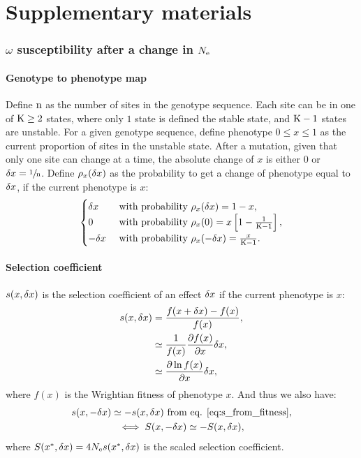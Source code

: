 \documentclass{article}
\renewcommand*{\bm}[1]{#1}%
\begin{document}
\part*{Supplementary materials}
\tableofcontents
\section{$\bm{\omega}$ susceptibility after a change in $\bm{\Ne}$}
\subsection{Genotype to phenotype map}
Define $\text{n}$ as the number of sites in the genotype sequence.
Each site can be in one of $\text{K} \geq 2$ states, where only $1$ state is defined the stable state, and $\text{K} - 1$ states are unstable.
For a given genotype sequence, define phenotype $0 \leq x \leq 1$ as the current proportion of sites in the unstable state.
After a mutation, given that only one site can change at a time, the absolute change of $x$ is either $0$ or $\delta x=\sfrac{1}{\text{n}}$.
Define $\rho_{x}(\delta x)$ as the probability to get a change of phenotype equal to $\delta x$, if the current phenotype is $x$:\\
\begin{gather}
\begin{cases}
\delta x &\text{ with probability } \rho_{x}(\delta x) = 1-x, \\
0 &\text{ with probability } \rho_{x}(0) = x \left[1 - \frac{1}{\text{K} - 1}\right], \\
-\delta x &\text{ with probability } \rho_{x}(-\delta x) = \frac{x}{\text{K} - 1}.\\
\end{cases} \label{eq:proba}
\end{gather}
\subsection{Selection coefficient}
$s(x, \delta x)$ is the selection coefficient of an effect $\delta x$ if the current phenotype is $x$:
\begin{align}
s(x, \delta x) &= \frac{f(x + \delta x) - f(x)}{f( x)}, \\
 &\simeq \frac{1}{f(x)}\frac{ \partial f(x) }{\partial x} \delta x, \\
 &\simeq \frac{ \partial \ln f(x) }{\partial x} \delta x, \label{eq:s_from_fitness}
\end{align}
where $f( x)$ is the Wrightian fitness of phenotype $x$. And thus we also have:
\begin{gather}
s(x, -\delta x) \simeq - s(x, \delta x) \text{ from eq. \ref{eq:s_from_fitness}} \label{eq:s_minus_deltax}, \\
\iff S(x, -\delta x) \simeq - S(x, \delta x), \label{eq:S_minus_deltax}
\end{gather}
where $S(x^{*}, \delta x) = 4N_{\mathrm{e}} s (x^{*}, \delta x)$ is the scaled selection coefficient.
\end{document}
